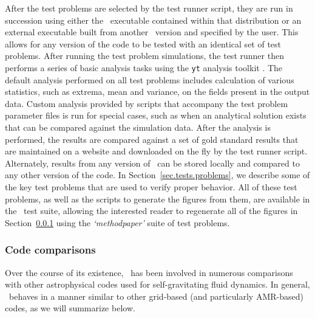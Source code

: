 After the test problems are selected by the test runner script, they
are run in succession using either the \enzo\ executable contained
within that distribution or an external executable built from another \enzo\
version and specified by the user.  This allows for any version of the
code to be tested with an identical set of test problems.  After
running the test problem simulations, the test runner then performs a
series of basic analysis tasks using the \texttt{yt} analysis toolkit
\citep{2011ApJS..192....9T, 2011arXiv1112.4482T}.  The default
analysis performed on all test problems includes calculation of
various statistics, such as extrema, mean and variance, on the fields
present in the output data.  Custom analysis provided by scripts that
accompany the test problem parameter files is run for special cases,
such as when an analytical solution exists that can be compared
against the simulation data.  After the analysis is performed, the
results are compared against a set of gold standard results that are
maintained on a website and downloaded on the fly by the test runner
script.  Alternately, results from any version of \enzo\ can be stored
locally and compared to any other version of the code.  In
Section~\ref{sec.tests.problems}, we describe some of the key test
problems that are used to verify proper behavior.  All of these test
problems, as well as the scripts to generate the figures from them,
are available in the \enzo\ test suite, allowing the interested reader
to regenerate all of the figures in Section~\ref{sec.tests.compare}
using the \textit{`methodpaper'} suite of test problems.

\subsubsection{Code comparisons}
\label{sec.tests.compare}

Over the course of its existence, \enzo\ has been involved in numerous
comparisons with other astrophysical codes used for self-gravitating
fluid dynamics.  In general, \enzo\ behaves in a manner similar to other
grid-based (and particularly AMR-based) codes, as we will summarize below.

